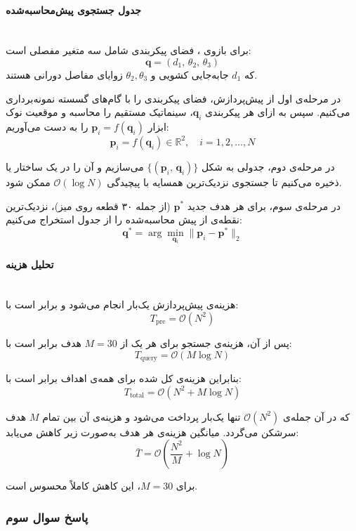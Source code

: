 \documentclass{article}
\begin{document}
\paragraph{جدول جستجوی پیش‌محاسبه‌شده}\mbox{}\\
برای بازوی ، فضای پیکربندی شامل سه متغیر مفصلی است:
$$\mathbf{q} = (d_1,\, \theta_2,\, \theta_3)$$
که $d_1$ جابه‌جایی کشویی و $\theta_2, \theta_3$ زوایای مفاصل دورانی هستند.

در مرحله‌ی اول از پیش‌پردازش، فضای پیکربندی را با گام‌های گسسته نمونه‌برداری می‌کنیم. سپس به ازای هر پیکربندی $\mathbf{q}_i$، سینماتیک مستقیم  را محاسبه و موقعیت نوک ابزار $\mathbf{p}_i = f(\mathbf{q}_i)$ را به دست می‌آوریم:
\[
    \mathbf{p}_i = f(\mathbf{q}_i) \in \mathbb{R}^2, \quad i = 1, 2, \ldots, N
\]

در مرحله‌ی دوم، جدولی به شکل $\{(\mathbf{p}_i,\, \mathbf{q}_i)\}$ می‌سازیم و آن را در یک ساختار  یا  ذخیره می‌کنیم تا جستجوی نزدیک‌ترین همسایه  با پیچیدگی $\mathcal{O}(\log N)$ ممکن شود.

در مرحله‌ی سوم، برای هر هدف جدید $\mathbf{p}^*$ (از جمله ۳۰ قطعه روی میز)، نزدیک‌ترین نقطه‌ی از پیش محاسبه‌شده را از جدول استخراج می‌کنیم:
\[
    \mathbf{q}^* = \arg\min_{\mathbf{q}_i} \|\mathbf{p}_i - \mathbf{p}^*\|_2
\]

\paragraph{تحلیل هزینه}\mbox{}\\
هزینه‌ی پیش‌پردازش یک‌بار انجام می‌شود و برابر است با:
\[
    T_{\text{pre}} = \mathcal{O}(N^2)
\]

پس از آن، هزینه‌ی جستجو برای هر یک از $M = 30$ هدف برابر است با:
\[
    T_{\text{query}} = \mathcal{O}(M \log N)
\]

بنابراین هزینه‌ی کل  شده برای همه‌ی اهداف برابر است با:
\[
    T_{\text{total}} = \mathcal{O}(N^2 + M \log N)
\]

که در آن جمله‌ی $\mathcal{O}(N^2)$ تنها یک‌بار پرداخت می‌شود و هزینه‌ی آن بین تمام $M$ هدف سرشکن  می‌گردد.
میانگین هزینه‌ی هر هدف به‌صورت زیر کاهش می‌یابد:
\[
    \bar{T} = \mathcal{O}\!\left(\frac{N^2}{M} + \log N\right)
\]

برای $M = 30$، این کاهش کاملاً محسوس است.
\subsubsection{پاسخ سوال سوم}
\end{document}
